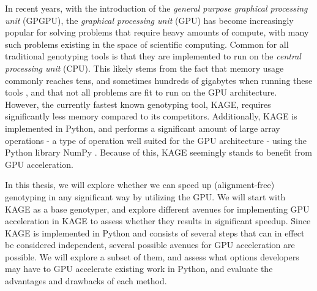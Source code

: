 In recent years, with the introduction of the \textit{general purpose graphical processing unit} (GPGPU), the \textit{graphical processing unit} (GPU) has become increasingly popular for solving problems that require heavy amounts of compute, with many such problems existing in the space of scientific computing.
Common for all traditional genotyping tools is that they are implemented to run on the \textit{central processing unit} (CPU).
This likely stems from the fact that memory usage commonly reaches tens, and sometimes hundreds of gigabytes when running these tools \cite{kage}, and that not all problems are fit to run on the GPU architecture.
However, the currently fastest known genotyping tool, KAGE, requires significantly less memory compared to its competitors.
Additionally, KAGE is implemented in Python, and performs a significant amount of large array operations - a type of operation well suited for the GPU architecture - using the Python library NumPy \cite{numpy}.
Because of this, KAGE seemingly stands to benefit from GPU acceleration.

In this thesis, we will explore whether we can speed up (alignment-free) genotyping in any significant way by utilizing the GPU.
We will start with KAGE as a base genotyper, and explore different avenues for implementing GPU acceleration in KAGE to assess whether they results in significant speedup.
Since KAGE is implemented in Python and consists of several steps that can in effect be considered independent, several possible avenues for GPU acceleration are possible.
We will explore a subset of them, and assess what options developers may have to GPU accelerate existing work in Python, and evaluate the advantages and drawbacks of each method.

